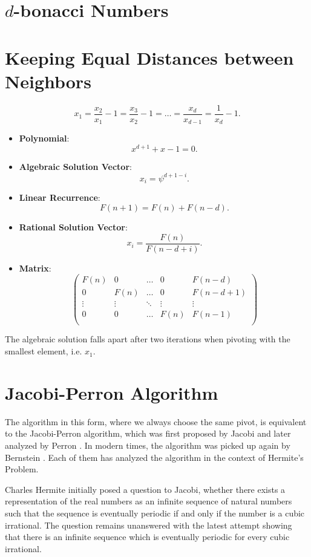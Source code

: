 \documentclass[english,version-2020-11]{uzl-thesis}
\begin{document}
\section{$d$-bonacci Numbers}

\section{Keeping Equal Distances between Neighbors}

\[
  x_1 = \frac{x_2}{x_1} - 1 = \frac{x_3}{x_2} - 1 = \dots = \frac{x_d}{x_{d-1}} = \frac{1}{x_d} - 1.
\]

\begin{itemize}
  \item \textbf{Polynomial}: \[x^{d+1} + x - 1 = 0.\]
  \item \textbf{Algebraic Solution Vector}: \[x_i = \psi^{d+1-i}.\]
  \item \textbf{Linear Recurrence}: \[F(n + 1) = F(n) + F(n - d).\]
  \item \textbf{Rational Solution Vector}: \[x_i = \frac{F(n)}{F(n-d+i)}.\]
  \item \textbf{Matrix}:
    \[\left(\begin{array}{cccc|c}
      F(n)   & 0      & \dots  & 0      & F(n - d) \\
        0    & F(n)   & \dots  & 0      & F(n - d + 1) \\
      \vdots & \vdots & \ddots & \vdots & \vdots   \\
        0    & 0      & \dots  & F(n)   & F(n - 1) \\
    \end{array}\right)\]
\end{itemize}

The algebraic solution falls apart after two iterations when pivoting with the
smallest element, i.e. $x_1$.

\section{Jacobi-Perron Algorithm}

The algorithm in this form, where we always choose the same pivot,
is equivalent to the Jacobi-Perron algorithm, which was first proposed
by Jacobi \cite{Jacobi68} and later analyzed by Perron \cite{Perron07}.
In modern times, the algorithm was picked up again by Bernstein \cite{Bernstein06}.
Each of them has analyzed the algorithm in the context of Hermite's Problem.

Charles Hermite initially posed a question to Jacobi, whether there exists a
representation of the real numbers as an infinite sequence of natural numbers
such that the sequence is eventually periodic if and only if the number is a
cubic irrational. The question remains unanswered with the latest attempt
\cite{Murru15} showing that there is an infinite sequence which is eventually
periodic for every cubic irrational.
\end{document}
